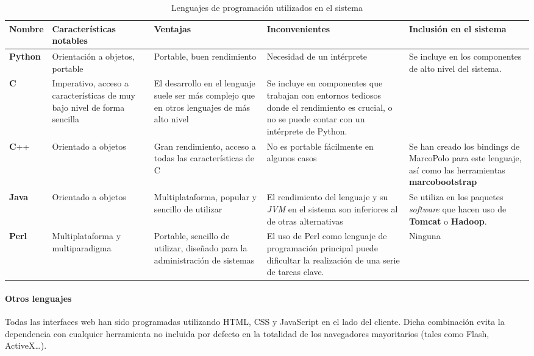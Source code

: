 \begin{landscape}
\begin{table}[H]
\begin{tabular}{|p{1.6cm}|p{4.3cm}|p{5.4cm}|p{5.5cm}|p{4.8cm}|}
\hline
Nombre & Características notables & Ventajas & Inconvenientes & Inclusión en el sistema\\ \hline

\textbf{Python} & Orientación a objetos, portable & Portable, buen rendimiento & Necesidad de un intérprete & Se incluye en los componentes de alto nivel del sistema.\\ \hline

\textbf{C} & Imperativo, acceso a características de muy bajo nivel de forma sencilla & El desarrollo en el lenguaje suele ser más complejo que en otros lenguajes de más alto nivel & Se incluye en componentes que trabajan con entornos tediosos donde el rendimiento es crucial, o no se puede contar con un intérprete de Python. & \\ \hline

\textbf{C}++ & Orientado a objetos & Gran rendimiento, acceso a todas las características de C & No es portable fácilmente en algunos casos & Se han creado los bindings de MarcoPolo para este lenguaje, así como las herramientas \textbf{marcobootstrap}\\ \hline

\textbf{Java} & Orientado a objetos & Multiplataforma, popular y sencillo de utilizar & El rendimiento del lenguaje y su \textit{JVM} en el sistema son inferiores al de otras alternativas & Se utiliza en los paquetes \textit{software} que hacen uso de \textbf{Tomcat} o \textbf{Hadoop}.\\ \hline
\textbf{Perl} & Multiplataforma y multiparadigma & Portable, sencillo de utilizar, diseñado para la administración de sistemas & El uso de Perl como lenguaje de programación principal puede dificultar la realización de una serie de tareas clave. & Ninguna\\ \hline
\end{tabular}
\caption{Lenguajes de programación utilizados en el sistema}
\end{table}
\end{landscape}

\paragraph{Otros lenguajes\\}

Todas las interfaces web han sido programadas utilizando HTML, CSS y JavaScript en el lado del cliente. Dicha combinación evita la dependencia con cualquier herramienta no incluida por defecto en la totalidad de los navegadores mayoritarios (tales como Flash, ActiveX\dots).


